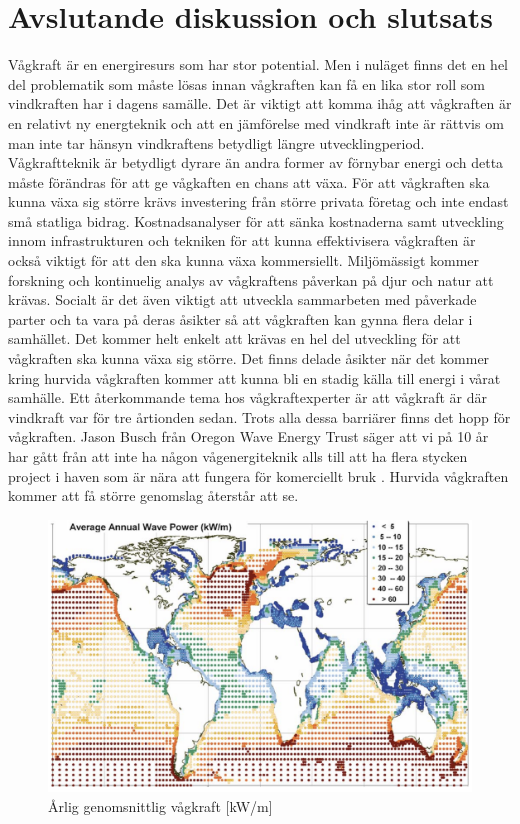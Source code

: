 \documentclass[10pt,a4paper,oneside]{article}
\begin{document}
\section{Avslutande diskussion och slutsats}
Vågkraft är en energiresurs som har stor potential. Men i nuläget finns det en hel del problematik som måste lösas innan vågkraften kan få en lika stor roll som vindkraften har i dagens samälle. 
Det är viktigt att komma ihåg att vågkraften är en relativt ny energteknik och att en jämförelse med vindkraft inte är rättvis om man inte tar hänsyn vindkraftens betydligt längre utvecklingperiod. Vågkraftteknik är betydligt dyrare än andra former av förnybar energi och detta måste förändras för att ge vågkaften en chans att växa. För att vågkraften ska kunna växa sig större krävs investering från större privata företag och inte endast små statliga bidrag. Kostnadsanalyser för att sänka kostnaderna samt utveckling innom infrastrukturen och tekniken för att kunna effektivisera vågkraften är också viktigt för att den ska kunna växa kommersiellt. Miljömässigt kommer forskning och kontinuelig analys av vågkraftens påverkan på djur och natur att krävas. Socialt är det även viktigt att utveckla sammarbeten med påverkade parter och ta vara på deras åsikter så att vågkraften kan gynna flera delar i samhället. Det kommer helt enkelt att krävas en hel del utveckling för att vågkraften ska kunna växa sig större. Det finns delade åsikter när det kommer kring hurvida vågkraften kommer att kunna bli en stadig källa till energi i vårat samhälle. Ett återkommande tema hos vågkraftexperter är att vågkraft är där vindkraft var för tre årtionden sedan. Trots alla dessa barriärer finns det hopp för vågkraften. Jason Busch från Oregon Wave Energy Trust säger att vi på 10 år har gått från att inte ha någon vågenergiteknik alls till att ha flera stycken project i haven som är nära att fungera för komerciellt bruk \cite{IRENA}. Hurvida vågkraften kommer att få större genomslag återstår att se. 
\newpage




\begin{figure}
\label{Globalmean}
	\includegraphics[scale=0.6]{globalmean.png}
	\caption{\r{A}rlig genomsnittlig v\r{a}gkraft [kW/m]}
\end{figure}
\end{document}
